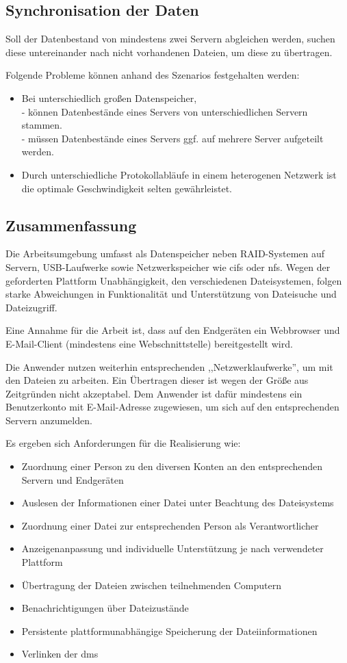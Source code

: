 \documentclass[oneside, ngerman, toc=bibliography,bibliography=totoc,listof=entryprefix, open=right,numbers=noenddot,fontsize=12pt]{scrbook}
\begin{document}
\subsection*{Synchronisation der Daten}
Soll der Datenbestand von mindestens zwei Servern abgleichen werden, suchen diese untereinander nach nicht vorhandenen Dateien, um diese zu übertragen.

\bigskip
Folgende Probleme können anhand des Szenarios festgehalten werden:
\begin{itemize}
	\item Bei unterschiedlich großen Datenspeicher,\\
    - können Datenbestände eines Servers von unterschiedlichen Servern stammen.\\
    - müssen Datenbestände eines Servers ggf. auf mehrere Server aufgeteilt werden.
	\item Durch unterschiedliche Protokollabläufe in einem heterogenen Netzwerk ist die optimale Geschwindigkeit selten gewährleistet.
\end{itemize}
 
\subsection*{Zusammenfassung}
Die Arbeitsumgebung umfasst als Datenspeicher neben RAID-Systemen auf Servern, USB-Laufwerke sowie Netzwerkspeicher wie \acrshort{cifs} oder \acrshort{nfs}. Wegen der geforderten Plattform Unabhängigkeit, den verschiedenen Dateisystemen, folgen starke Abweichungen in Funktionalität und Unterstützung von Dateisuche und Dateizugriff.

Eine Annahme für die Arbeit ist, dass auf den Endgeräten ein Webbrowser und E-Mail-Client (mindestens eine Webschnittstelle) bereitgestellt wird.

Die Anwender nutzen weiterhin entsprechenden ,,Netzwerklaufwerke'', um mit den Dateien zu arbeiten.
Ein Übertragen dieser ist wegen der Größe aus Zeitgründen nicht akzeptabel. Dem Anwender ist dafür mindestens ein Benutzerkonto mit E-Mail-Adresse zugewiesen, um sich auf den entsprechenden Servern anzumelden. 

\bigskip
Es ergeben sich Anforderungen für die Realisierung wie:
\begin{itemize}
\item Zuordnung einer Person zu den diversen Konten an den entsprechenden Servern und Endgeräten
\item Auslesen der Informationen einer Datei unter Beachtung des Dateisystems
\item Zuordnung einer Datei zur entsprechenden Person als Verantwortlicher
\item Anzeigenanpassung und individuelle Unterstützung je nach verwendeter Plattform
\item Übertragung der Dateien zwischen teilnehmenden Computern
\item Benachrichtigungen über Dateizustände
\item Persistente plattformunabhängige Speicherung der Dateiinformationen 
\item Verlinken der \acrshort{dms}
\end{itemize}
 
\end{document}
